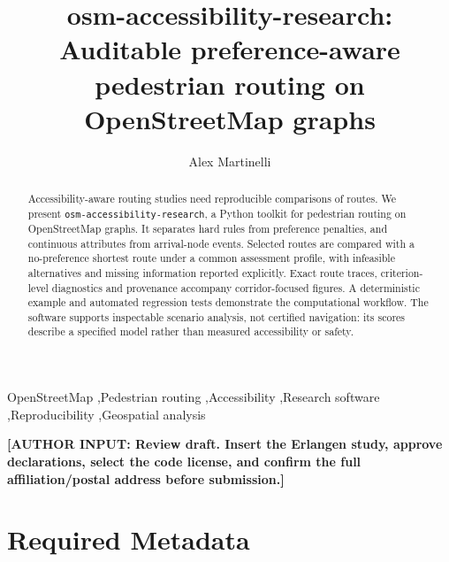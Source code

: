 \documentclass[preprint,12pt,a4paper]{elsarticle}
\newcommand{\software}{\texttt{osm-\allowbreak accessibility-\allowbreak research}}
\newcommand{\AuthorQuery}[1]{\textcolor{red!65!black}{\textbf{[AUTHOR INPUT: #1]}}}
\begin{document}
\begin{frontmatter}
\title{osm-accessibility-research: Auditable preference-aware pedestrian routing on OpenStreetMap graphs}
\author[fau]{Alex Martinelli}
\address[fau]{M.Sc. Data Science, Friedrich-Alexander-Universit\"at Erlangen-N\"urnberg (FAU), Erlangen, Germany}

\begin{abstract}
Accessibility-aware routing studies need reproducible comparisons of routes.
We present
\software{}, a Python toolkit for pedestrian routing on OpenStreetMap graphs.
It separates hard rules from preference penalties, and continuous attributes
from arrival-node events. Selected routes are compared with a
no-preference shortest route under a common assessment profile, with infeasible
alternatives and missing information reported explicitly. Exact route traces,
criterion-level diagnostics and provenance accompany corridor-focused figures.
A deterministic example and automated regression tests demonstrate the
computational workflow. The software supports inspectable scenario analysis,
not certified navigation: its scores describe a specified model rather than
measured accessibility or safety.
\end{abstract}

\begin{keyword}
OpenStreetMap \sep Pedestrian routing \sep Accessibility \sep Research software
\sep Reproducibility \sep Geospatial analysis
\end{keyword}
\end{frontmatter}

\noindent\AuthorQuery{Review draft. Insert the Erlangen study, approve declarations,
select the code license, and confirm the full affiliation/postal address before submission.}

\clearpage
\section*{Required Metadata}
\end{document}
